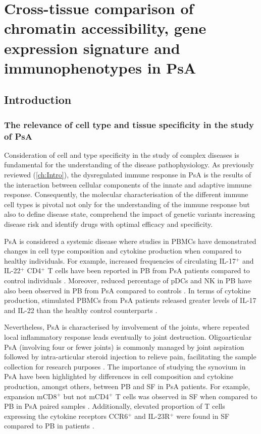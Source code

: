 \chapter{Cross-tissue comparison of chromatin accessibility, gene expression signature and immunophenotypes in PsA}
\label{ch:Results3}



\section{Introduction}

\subsection{The relevance of cell type and tissue specificity in the study of PsA}

Consideration of cell and type specificity in the study of complex diseases is fundamental for the understanding of the disease pathophysiology. As previously reviewed (\ref{ch:Intro}), the dysregulated immune response in PsA is the results of the interaction between cellular components of the innate and adaptive immune response. Consequently, the molecular characterisation of the different immune cell types is pivotal not only for the understanding of the immune response but also to define disease state, comprehend the impact of genetic variants increasing disease risk and identify drugs with optimal efficacy and specificity.

PsA is considered a systemic disease where studies in PBMCs have demonstrated changes in cell type composition and cytokine production when compared to healthy individuals. For example, increased frequencies of circulating IL-17$^+$ and IL-22$^+$ CD4$^+$ T cells have been reported in PB from PsA patients compared to control individuals \parencite{Benham2013}. Moreover, reduced percentage of pDCs and NK in PB have also been observed in PB from PsA compared to controls \parencite{Jongbloed2006, Spadaro2004}. In terms of cytokine production, stimulated PBMCs from PsA patients released greater levels of IL-17 and IL-22 than the healthy control counterparts \parencite{Benham2013}. 

Nevertheless, PsA is characterised by involvement of the joints, where repeated local inflammatory response leads eventually to joint destruction. Oligoarticular PsA (involving four or fewer joints) is commonly managed by joint aspiration followed by intra-articular steroid injection to relieve pain, facilitating the sample collection for research purposes \parencite{Kavanaugh2006}. The importance of studying the synovium in PsA have been highlighted by differences in cell composition and cytokine production, amongst others, between PB and SF in PsA patients. For example, expansion mCD8$^+$ but not mCD4$^+$ T cells was observed in SF when compared to PB in PsA paired samples \parencite{Ross2000}. Additionally, elevated proportion of T cells expressing the cytokine receptors CCR6$^+$ and IL-23R$^+$ were found in SF compared to PB in patients \parencite{Benham2013}.


